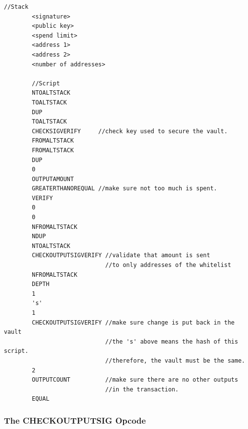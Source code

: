 \documentclass{article}
\begin{document}
\begin{center}
    \begin{lstlisting}[caption=Simple Vault Script,basicstyle=\small]
        //Stack
        <signature>
        <public key>
        <spend limit>
        <address 1>
        <address 2>
        <number of addresses>

        //Script
        NTOALTSTACK              
        TOALTSTACK               
        DUP                 
        TOALTSTACK          
        CHECKSIGVERIFY     //check key used to secure the vault.
        FROMALTSTACK        
        FROMALTSTACK        
        DUP                 
        0                      
        OUTPUTAMOUNT       
        GREATERTHANOREQUAL //make sure not too much is spent.
        VERIFY              
        0                      
        0                      
        NFROMALTSTACK       
        NDUP                
        NTOALTSTACK         
        CHECKOUTPUTSIGVERIFY //validate that amount is sent
                             //to only addresses of the whitelist
        NFROMALTSTACK       
        DEPTH               
        1                      
        's'                    
        1                      
        CHECKOUTPUTSIGVERIFY //make sure change is put back in the vault
                             //the 's' above means the hash of this script.
                             //therefore, the vault must be the same.
        2                      
        OUTPUTCOUNT          //make sure there are no other outputs
                             //in the transaction.
        EQUAL               
    \end{lstlisting}
\end{center}

\subsubsection{The CHECKOUTPUTSIG Opcode}

\begin{center}
\end{center}
\end{document}
